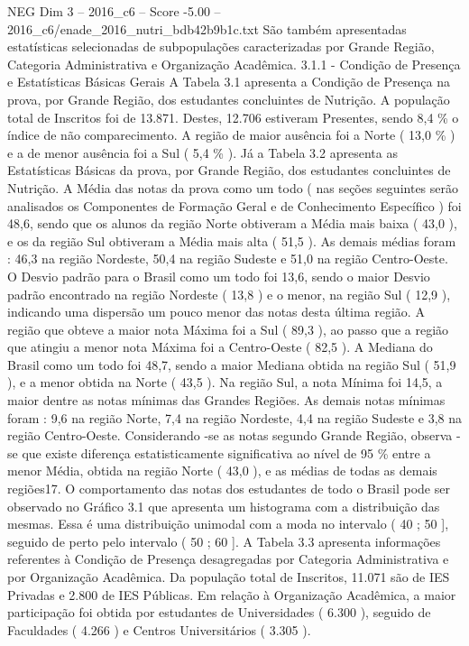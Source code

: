 \begin{textsample}{NEG Dim 3 – 2016\_c6 – Score -5.00 – 2016\_c6/enade\_2016\_nutri\_bdb42b9b1c.txt}
São também apresentadas estatísticas selecionadas de subpopulações caracterizadas por Grande Região, Categoria Administrativa e Organização Acadêmica. 3.1.1 - Condição de Presença e Estatísticas Básicas Gerais A Tabela 3.1 apresenta a Condição de Presença na prova, por Grande Região, dos estudantes concluintes de Nutrição.
A população total de Inscritos foi de 13.871.
Destes, 12.706 estiveram Presentes, sendo 8,4 \% o índice de não comparecimento.
A região de maior ausência foi a Norte ( 13,0 \% ) e a de menor ausência foi a Sul ( 5,4 \% ).
Já a Tabela 3.2 apresenta as Estatísticas Básicas da prova, por Grande Região, dos estudantes concluintes de Nutrição.
A Média das notas da prova como um todo ( nas seções seguintes serão analisados os Componentes de Formação Geral e de Conhecimento Específico ) foi 48,6, sendo que os alunos da região Norte obtiveram a Média mais baixa ( 43,0 ), e os da região Sul obtiveram a Média mais alta ( 51,5 ).
As demais médias foram : 46,3 na região Nordeste, 50,4 na região Sudeste e 51,0 na região Centro-Oeste.
O Desvio padrão para o Brasil como um todo foi 13,6, sendo o maior Desvio padrão encontrado na região Nordeste ( 13,8 ) e o menor, na região Sul ( 12,9 ), indicando uma dispersão um pouco menor das notas desta última região.
A região que obteve a maior nota Máxima foi a Sul ( 89,3 ), ao passo que a região que atingiu a menor nota Máxima foi a Centro-Oeste ( 82,5 ).
A Mediana do Brasil como um todo foi 48,7, sendo a maior Mediana obtida na região Sul ( 51,9 ), e a menor obtida na Norte ( 43,5 ).
Na região Sul, a nota Mínima foi 14,5, a maior dentre as notas mínimas das Grandes Regiões.
As demais notas mínimas foram : 9,6 na região Norte, 7,4 na região Nordeste, 4,4 na região Sudeste e 3,8 na região Centro-Oeste.
Considerando -se as notas segundo Grande Região, observa -se que existe diferença estatisticamente significativa ao nível de 95 \% entre a menor Média, obtida na região Norte ( 43,0 ), e as médias de todas as demais regiões17.
O comportamento das notas dos estudantes de todo o Brasil pode ser observado no Gráfico 3.1 que apresenta um histograma com a distribuição das mesmas.
Essa é uma distribuição unimodal com a moda no intervalo ( 40 ; 50 ], seguido de perto pelo intervalo ( 50 ; 60 ].
A Tabela 3.3 apresenta informações referentes à Condição de Presença desagregadas por Categoria Administrativa e por Organização Acadêmica.
Da população total de Inscritos, 11.071 são de IES Privadas e 2.800 de IES Públicas.
Em relação à Organização Acadêmica, a maior participação foi obtida por estudantes de Universidades ( 6.300 ), seguido de Faculdades ( 4.266 ) e Centros Universitários ( 3.305 ).

\end{textsample}
